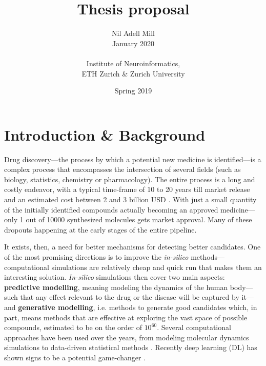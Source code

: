 \documentclass{article}
\begin{document}
\title{\Large Thesis proposal}
\author{Nil Adell Mill \\
        January 2020 \\ \\
        Institute of Neuroinformatics, \\
        ETH Zurich \& Zurich University}
\date{Spring 2019}

\maketitle

    \section*{Introduction \& Background}  

Drug discovery---the process by which a potential new medicine is identified---is a
 complex process that encompasses the intersection of several fields (such as biology,
 statistics, chemistry or pharmacology). The entire process is a long and costly
 endeavor, with a typical time-frame of 10 to 20 years till market release and an
 estimated cost between 2 and 3 billion USD \cite{Schneider2019, Scannell2012}. With
 just a small quantity of the initially identified compounds actually becoming an
 approved medicine—only 1 out of 10000 synthesized molecules gets market approval. Many
 of these dropouts happening at the early stages of the entire pipeline.

It exists, then, a need for better mechanisms for detecting better candidates. One of
 the most promising directions is to improve the \emph{in-silico}
 methods---computational simulations are relatively cheap and quick run that makes them
 an interesting solution. \emph{In-silico} simulations then cover two main aspects:
 \textbf{predictive modelling}, meaning modeling the dynamics of the human body---such
 that any effect relevant to the drug or the disease will be captured by it---and
 \textbf{generative modelling}, i.e. methods to generate good candidates which, in part,
 means methods that are effective at exploring the vast space of possible compounds,
 estimated to be on the order of $10^{60}$\cite{Reymond2012}. Several computational
 approaches have been used over the years, from modeling molecular dynamics simulations
 to data-driven statistical methods \cite{Hung2014, Kuhn2016}. Recently deep learning
 (DL) has shown signs to be a potential game-changer \cite{Dargan2019}. 


\end{document}
